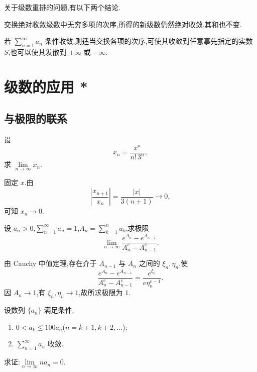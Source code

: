关于级数重排的问题,有以下两个结论.

\begin{theorem}[\markstar]
    交换绝对收敛级数中无穷多项的次序,所得的新级数仍然绝对收敛,其和也不变.
\end{theorem}

\begin{theorem}
    若 $\displaystyle\sum\limits_{n=1}^{\infty}a_n$ 条件收敛,则适当交换各项的次序,可使其收敛到任意事先指定的实数 $S$,也可以使其发散到 $+\infty$ 或 $-\infty$.
\end{theorem}


\newpage

\section{级数的应用 *}


\subsection{与极限的联系}

\begin{example}
    设
    \[
        x_n=\dfrac{x^n}{n!\,3^n},
    \]
    求 $\displaystyle\lim\limits_{n\to\infty}x_n$.
\end{example}
\exampleblank

\begin{solution}
    固定 $x$.由
    \[
        \left|\dfrac{x_{n+1}}{x_n}\right|=\dfrac{|x|}{3(n+1)}\longrightarrow0,
    \]
    可知 $x_n\to\boxed0$.
\end{solution}

\begin{example}
    设 $a_n>0$,$\displaystyle\sum\limits_{n=1}^{\infty}a_n=1$,$\displaystyle A_n=\sum\limits_{k=1}^na_k$,求极限
    \[
        \displaystyle\lim\limits_{n\to\infty}\dfrac{e^{A_n}-e^{A_{n-1}}}{A_n^e-A_{n-1}^e}.
    \]
\end{example}
\exampleblank

\begin{solution}
    由 Cauchy 中值定理,存在介于 $A_{n-1}$ 与 $A_n$ 之间的 $\xi_n,\eta_n$,使
    \[
        \dfrac{e^{A_n}-e^{A_{n-1}}}{A_n^e-A_{n-1}^e}
        =\dfrac{e^{\xi_n}}{e\eta_n^{e-1}}.
    \]
    因 $A_n\to1$,有 $\xi_n,\eta_n\to1$,故所求极限为 $\boxed1$.
\end{solution}

\begin{example}
    设数列 $\{a_n\}$ 满足条件:
    \begin{enumerate}
        \item $0<a_k\leq100a_n$($n=k+1,k+2,\ldots$);
        \item $\displaystyle\sum\limits_{n=1}^{\infty}a_n$ 收敛.
    \end{enumerate}
    求证:$\displaystyle\lim\limits_{n\to\infty}na_n=0$.
\end{example}
\exampleblank

